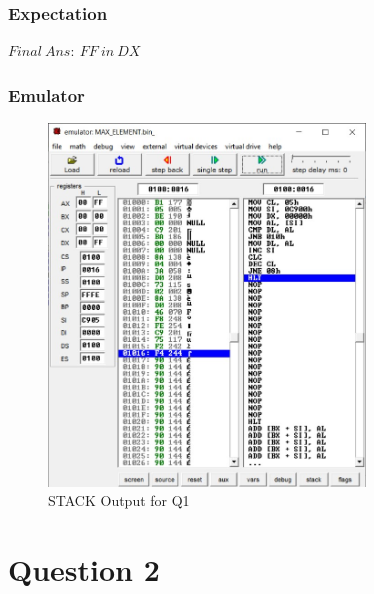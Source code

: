 \documentclass{article}
\begin{document}
\subsubsection{Expectation}
$ 
Final\ Ans:\  FF\ in\ DX
$ 

\break
\subsubsection{Emulator}

\begin{figure}[h]
\begin{center}
\includegraphics[width=0.75\textwidth]{MAX_ELEMENT_OUT} 
\caption{STACK Output for Q1}
\end{center}
\end{figure}



\break
\section{Question 2}
\end{document}
